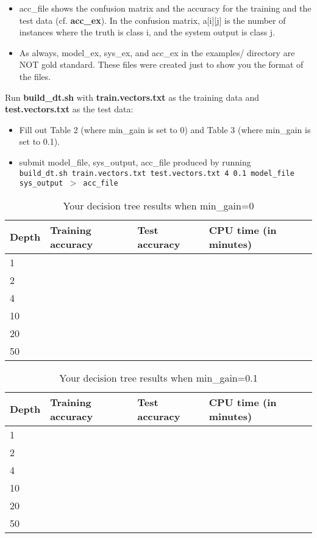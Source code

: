 \documentclass[11pt]{article}
\begin{document}
\begin{itemize}
  \item acc\_file shows the confusion matrix and the accuracy for
       the training and the test data (cf. {\bf acc\_ex}).
       In the confusion matrix, a[i][j] is the number of instances
        where the truth is class i, and the system output is class j.

   \item As always, model\_ex, sys\_ex, and acc\_ex in the examples/ directory
         are NOT gold standard.
        These files were created just to show you the format of the files.
\end{itemize}

\noindent Run {\bf build\_dt.sh} 
with {\bf train.vectors.txt} as the 
training data and {\bf test.vectors.txt} as the test data:
\begin{itemize}
  \item Fill out Table 2 (where min\_gain is set to 0) and Table 3 
    (where min\_gain is set to 0.1).
  \item submit model\_file, sys\_output, acc\_file produced by running \\
    {\tt build\_dt.sh train.vectors.txt test.vectors.txt 4 0.1 model\_file sys\_output $>$ acc\_file}
\end{itemize}


\begin{table}[hbtp]
\centering
\caption{Your decision tree results when min\_gain=0}
\label{table2}
\begin{tabular}{|l|l|l|l|} \hline
Depth   & Training accuracy & Test accuracy & CPU time (in minutes)\\ \hline
1       &  &  &  \\ \hline
2       &  &  &  \\ \hline
4       &  &  &  \\ \hline
10      &  &  &  \\ \hline
20      &  &  &  \\ \hline
50      &  &  &       \\ \hline
\end{tabular}
\end{table}


\begin{table}[hbtp]
\centering
\caption{Your decision tree results when min\_gain=0.1}
\label{table3}
\begin{tabular}{|l|l|l|l|} \hline
Depth   & Training accuracy & Test accuracy & CPU time (in minutes)\\ \hline
1       &  &  &  \\ \hline
2       &  &  &  \\ \hline
4       &  &  &  \\ \hline
10      &  &  &  \\ \hline
20      &  &  &  \\ \hline
50      &  &  &       \\ \hline
\end{tabular}
\end{table}
\end{document}
